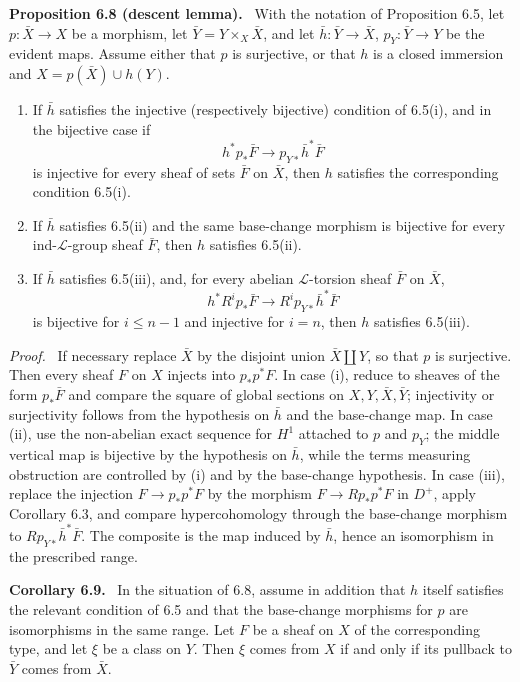 \documentclass[12pt]{article}
\newcommand{\LL}{\mathcal L}
\newenvironment{statement}[1]{\par\medskip\noindent\textbf{#1.}\ }{\par\medskip}
\newenvironment{prooftext}[1][Proof]{\par\noindent\emph{#1.}\ }{\par\medskip}
\begin{document}
\begin{statement}{Proposition 6.8 (descent lemma)}
With the notation of Proposition 6.5, let \(p:\bar X\to X\) be a morphism, let \(\bar Y=Y\times_X\bar X\), and let \(\bar h:\bar Y\to\bar X\), \(p_Y:\bar Y\to Y\) be the evident maps. Assume either that \(p\) is surjective, or that \(h\) is a closed immersion and \(X=p(\bar X)\cup h(Y)\).
\begin{enumerate}[label=(\roman*)]
\item If \(\bar h\) satisfies the injective (respectively bijective) condition of 6.5(i), and in the bijective case if
\[
h^*p_*\bar F\longrightarrow p_{Y*}\bar h^*\bar F
\]
is injective for every sheaf of sets \(\bar F\) on \(\bar X\), then \(h\) satisfies the corresponding condition 6.5(i).
\item If \(\bar h\) satisfies 6.5(ii) and the same base-change morphism is bijective for every ind-\(\LL\)-group sheaf \(\bar F\), then \(h\) satisfies 6.5(ii).
\item If \(\bar h\) satisfies 6.5(iii), and, for every abelian \(\LL\)-torsion sheaf \(\bar F\) on \(\bar X\),
\[
h^*R^ip_*\bar F\longrightarrow R^ip_{Y*}\bar h^*\bar F
\]
is bijective for \(i\le n-1\) and injective for \(i=n\), then \(h\) satisfies 6.5(iii).
\end{enumerate}
\end{statement}

\begin{prooftext}
If necessary replace \(\bar X\) by the disjoint union \(\bar X\amalg Y\), so that \(p\) is surjective. Then every sheaf \(F\) on \(X\) injects into \(p_*p^*F\). In case (i), reduce to sheaves of the form \(p_*\bar F\) and compare the square of global sections on \(X,Y,\bar X,\bar Y\); injectivity or surjectivity follows from the hypothesis on \(\bar h\) and the base-change map. In case (ii), use the non-abelian exact sequence for \(H^1\) attached to \(p\) and \(p_Y\); the middle vertical map is bijective by the hypothesis on \(\bar h\), while the terms measuring obstruction are controlled by (i) and by the base-change hypothesis. In case (iii), replace the injection \(F\to p_*p^*F\) by the morphism \(F\to Rp_*p^*F\) in \(D^+\), apply Corollary 6.3, and compare hypercohomology through the base-change morphism to \(Rp_{Y*}\bar h^*\bar F\). The composite is the map induced by \(\bar h\), hence an isomorphism in the prescribed range.
\end{prooftext}

\begin{statement}{Corollary 6.9}
In the situation of 6.8, assume in addition that \(h\) itself satisfies the relevant condition of 6.5 and that the base-change morphisms for \(p\) are isomorphisms in the same range. Let \(F\) be a sheaf on \(X\) of the corresponding type, and let \(\xi\) be a class on \(Y\). Then \(\xi\) comes from \(X\) if and only if its pullback to \(\bar Y\) comes from \(\bar X\).
\end{statement}
\end{document}
